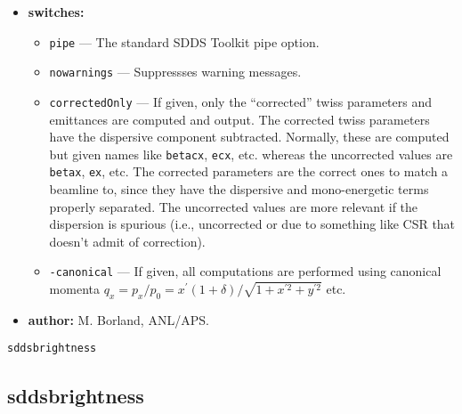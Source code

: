 \documentclass[11pt]{article}
\begin{document}
\begin{itemize}
\begin{itemize}
\end{itemize}

\item {\bf switches:}
\begin{itemize}
\item {\tt pipe} --- The standard SDDS Toolkit pipe option.
\item {\tt nowarnings} --- Suppressses warning messages.
\item {\tt correctedOnly} --- If given, only the ``corrected'' twiss parameters and emittances are computed and
 output.  The corrected twiss parameters have the dispersive component subtracted.  Normally, these are
computed but given names like \verb|betacx|, \verb|ecx|, etc. whereas the uncorrected values are 
\verb|betax|, \verb|ex|, etc. The corrected parameters are the correct ones to match a beamline to, since they have the
 dispersive and mono-energetic terms properly separated.  The uncorrected values are more relevant if the dispersion
is spurious (i.e., uncorrected or due to something like CSR that doesn't admit of correction).
\item {\tt -canonical} --- If given, all computations are performed using canonical momenta 
  $q_x = p_x/p_0 = x^\prime (1 + \delta)/\sqrt{1 + x^{\prime 2} + y^{\prime 2}}$ etc.
\end{itemize}

\item {\bf author:} M. Borland, ANL/APS.
\end{itemize}

\begin{latexonly}
\newpage
\begin{center}{\Large\verb|sddsbrightness|}\end{center}
\end{latexonly}
\subsection{sddsbrightness}
\end{document}
